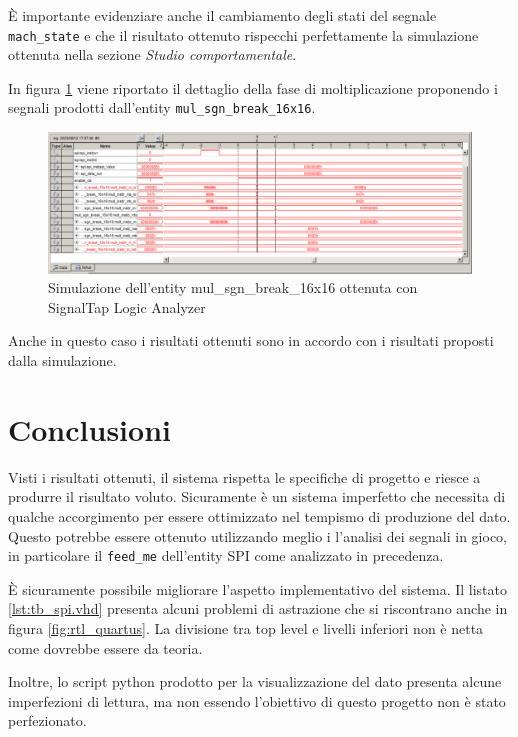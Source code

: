 \documentclass[titlepage]{report}
\begin{document}
		È importante evidenziare anche il cambiamento degli stati del segnale \texttt{mach\_state} e che il risultato ottenuto rispecchi perfettamente la simulazione ottenuta nella sezione \textit{Studio comportamentale}.

		In figura \ref*{fig:quartus_sim_signaltap2} viene riportato il dettaglio della fase di moltiplicazione proponendo i segnali prodotti dall'entity \texttt{mul\_sgn\_break\_16x16}.

		\begin{figure}[H]
			\centering
			\includegraphics[scale=0.4]{./img/signaltap_multiply_step_by_step.png}
			\caption{Simulazione dell'entity mul\_sgn\_break\_16x16 ottenuta con SignalTap Logic Analyzer}
			\label{fig:quartus_sim_signaltap2}
		\end{figure}

		Anche in questo caso i risultati ottenuti sono in accordo con i risultati proposti dalla simulazione.

\chapter*{Conclusioni}
\label{ch:conclusioni}
	
	Visti i risultati ottenuti, il sistema rispetta le specifiche di progetto e riesce a produrre il risultato voluto. Sicuramente è un sistema imperfetto che necessita di qualche accorgimento per essere ottimizzato nel tempismo di produzione del dato. Questo potrebbe essere ottenuto utilizzando meglio i l'analisi dei segnali in gioco, in particolare il \texttt{feed\_me} dell'entity SPI come analizzato in precedenza. 

	È sicuramente possibile migliorare l'aspetto implementativo del sistema. Il listato \ref{lst:tb_spi.vhd} presenta alcuni problemi di astrazione che si riscontrano anche in figura \ref{fig:rtl_quartus}. La divisione tra top level e livelli inferiori non è netta come dovrebbe essere da teoria.

	Inoltre, lo script python prodotto per la visualizzazione del dato presenta alcune imperfezioni di lettura, ma non essendo l'obiettivo di questo progetto non è stato perfezionato.


\listoffigures
\listoftables
\lstlistoflistings
\end{document}
